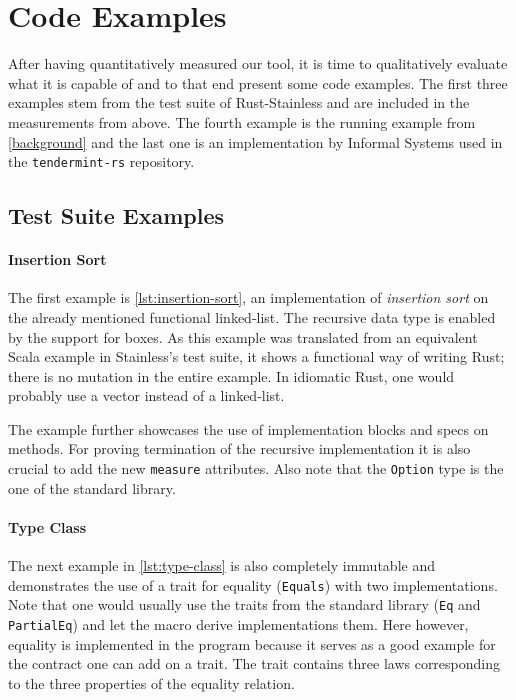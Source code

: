 


\section{Code Examples}

After having quantitatively measured our tool, it is time to qualitatively
evaluate what it is capable of and to that end present some code examples. The
first three examples stem from the test suite of Rust-Stainless and are included
in the measurements from above. The fourth example is the running example from
\autoref{background} and the last one is an implementation by Informal Systems
used in the \texttt{tendermint-rs} repository.

\subsection{Test Suite Examples}

\paragraph{Insertion Sort}

The first example is \autoref{lst:insertion-sort}, an implementation of
\emph{insertion sort} on the already mentioned functional linked-list. The
recursive data type is enabled by the support for boxes. As this example was
translated from an equivalent Scala example in Stainless's test suite, it shows
a functional way of writing Rust; there is no mutation in the entire example. In
idiomatic Rust, one would probably use a vector instead of a linked-list.

The example further showcases the use of implementation blocks and specs on
methods. For proving termination of the recursive implementation it is also
crucial to add the new \lstinline!measure! attributes. Also note that the
\lstinline!Option! type is the one of the standard library.

\paragraph{Type Class}

The next example in \autoref{lst:type-class} is also completely immutable and
demonstrates the use of a trait for equality (\lstinline!Equals!) with two
implementations. Note that one would usually use the traits from the standard
library (\lstinline!Eq! and \lstinline!PartialEq!) and let the macro derive
implementations them. Here however, equality is implemented in the program
because it serves as a good example for the contract one can add on a trait. The
trait contains three laws corresponding to the three properties of the equality
relation.


